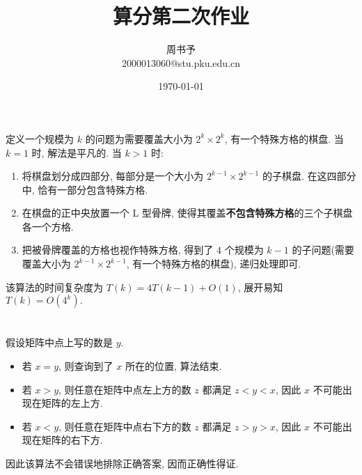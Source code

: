 \documentclass[8pt]{article}
\title{\heiti\zihao{1} 算分第二次作业}
\author{\kaishu\zihao{-3} 周书予\\2000013060@stu.pku.edu.cn}
\date{\today}
\begin{document}
\pagestyle{fancy}


\maketitle

\section{}

定义一个规模为 $k$ 的问题为需要覆盖大小为 $2^k \times 2^k$, 有一个特殊方格的棋盘. 当 $k = 1$ 时, 解法是平凡的. 当 $k > 1$ 时:

\begin{enumerate}
	\item 将棋盘划分成四部分, 每部分是一个大小为 $2^{k-1} \times 2^{k-1}$ 的子棋盘. 在这四部分中, 恰有一部分包含特殊方格.
	\item 在棋盘的正中央放置一个 L 型骨牌, 使得其覆盖\textbf{不包含特殊方格}的三个子棋盘各一个方格.
	\item 把被骨牌覆盖的方格也视作特殊方格, 得到了 $4$ 个规模为 $k-1$ 的子问题(需要覆盖大小为 $2^{k-1} \times 2^{k-1}$, 有一个特殊方格的棋盘), 递归处理即可.
\end{enumerate}

该算法的时间复杂度为 $T(k) = 4T(k-1) + O(1)$, 展开易知 $T(k) = O(4^k).$

\section{}
\subsection{}

假设矩阵中点上写的数是 $y$.

\begin{itemize}
	\item 若 $x = y$, 则查询到了 $x$ 所在的位置, 算法结束.
	\item 若 $x > y$, 则任意在矩阵中点左上方的数 $z$ 都满足 $z < y < x$, 因此 $x$ 不可能出现在矩阵的左上方.
	\item 若 $x < y$, 则任意在矩阵中点右下方的数 $z$ 都满足 $z > y > x$, 因此 $x$ 不可能出现在矩阵的右下方.
\end{itemize}

因此该算法不会错误地排除正确答案, 因而正确性得证.
\end{document}
